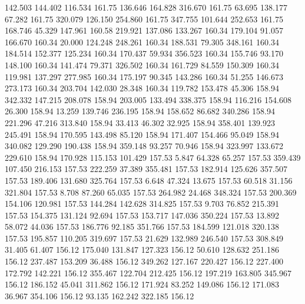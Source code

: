  142.503  144.402  116.534       161.75
 136.646  164.828  316.670       161.75
  63.695  138.177   67.282       161.75
 320.079  126.150  254.860       161.75
 347.755  101.644  252.653       161.75
 168.746   45.329  147.961       160.58
 219.921  137.086  133.267       160.34
 179.104   91.057  166.670       160.34
  20.000  124.248  248.261       160.34
 188.531   79.305  348.161       160.34
 184.514  152.377  125.234       160.34
 170.437   59.934  356.523       160.34
 155.746   93.170  148.100       160.34
 141.474   79.371  326.502       160.34
 161.729   84.559  150.309       160.34
 119.981  137.297  277.985       160.34
 175.197   90.345  143.286       160.34
  51.255  146.673  273.173       160.34
 203.704  142.030   28.348       160.34
 119.782  153.478   45.306       158.94
 342.332  147.215  208.078       158.94
 203.005  133.494  338.375       158.94
 116.216  154.608   26.300       158.94
  13.259  139.746  236.195       158.94
 158.652   86.682  340.286       158.94
 221.296   47.216  313.840       158.94
  33.413   46.302   32.925       158.94
 358.401  139.923  245.491       158.94
 170.595  143.498   85.120       158.94
 171.407  154.466   95.049       158.94
 340.082  129.290  190.438       158.94
 359.148   93.257   70.946       158.94
 323.997  133.672  229.610       158.94
 170.928  115.153  101.429       157.53
   5.847   64.328   65.257       157.53
 359.439  107.450  216.153       157.53
 222.259   37.389  355.481       157.53
 182.914  125.626  357.507       157.53
 189.406  131.680  325.764       157.53
   6.648   47.324   13.675       157.53
  60.518   31.156  321.804       157.53
   8.708   87.260   65.035       157.53
 264.982   24.468  348.324       157.53
 200.369  154.106  120.981       157.53
 144.284  142.628  314.825       157.53
   9.703   76.852  215.391       157.53
 154.375  131.124   92.694       157.53
 153.717  147.036  350.224       157.53
  13.892   58.072   44.036       157.53
 186.776   92.185  351.766       157.53
 184.599  121.018  320.138       157.53
 195.857  110.205  319.697       157.53
  21.629  132.989  246.540       157.53
 308.849   31.405   61.407       156.12
 175.040  131.847  127.323       156.12
  50.610  128.632  251.186       156.12
 237.487  153.209   36.488       156.12
 349.262  127.167  220.427       156.12
 227.400  172.792  142.221       156.12
 355.467  122.704  212.425       156.12
 197.219  163.805  345.967       156.12
 186.152   45.041  311.862       156.12
 171.924   83.252  149.086       156.12
 171.083   36.967  354.106       156.12
  93.135  162.242  322.185       156.12
